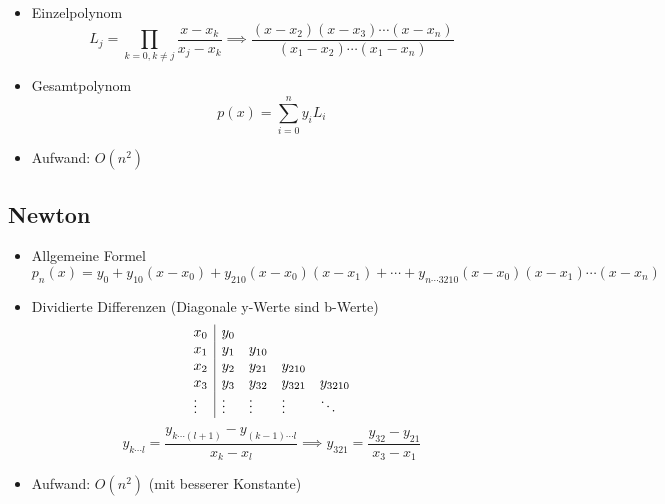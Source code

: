 \begin{itemize}
	
	\item Einzelpolynom \\
	\begin{displaymath}
		L_{j} = \prod_{k=0, k\neq j} \frac{x - x_{k}}{x_{j} - x_{k}}
		\implies
		\frac{(x - x_{2}) (x - x_{3}) \cdots (x - x_{n})}{(x_{1} - x_{2}) \cdots (x_{1} - x_{n})}
	\end{displaymath}
	
	\item Gesamtpolynom \\
	\begin{equation*}
		p(x) = \sum_{i=0}^{n} y_{i} L_{i}
	\end{equation*}
	
	\item Aufwand: $O(n^{2})$
	
\end{itemize}

\pagebreak
\subsection{Newton}

\begin{itemize}
	
	\item Allgemeine Formel \\
	\begin{equation*}
		p_n(x) = y_0 + y_{10} (x - x_0) + y_{210} (x - x_0)(x - x_1) + \cdots + y_{n\cdots 3210} (x - x_0)(x - x_1) \cdots (x - x_n)
	\end{equation*}
	
	\item Dividierte Differenzen (Diagonale y-Werte sind b-Werte)\\
	\begin{displaymath}
		\begin{array}{l | l l l l}
			x_0		& y_0 		\\
			x_1		& y_1		& y_{10}	\\
			x_2		& y_2		& y_{21}	& y_{210}	\\
			x_3		& y_3		& y_{32}	& y_{321}	& y_{3210} \\
			\vdots	& \vdots	& \vdots	& \vdots	& \ddots \\
		\end{array}
	\end{displaymath}
	\begin{displaymath}
		y_{k\cdots l} = \frac{y_{k\cdots (l+1)} - y_{(k-1)\cdots l}}{x_k - x_l}
		\implies
		y_{321} = \frac{y_{32} - y_{21}}{x_3 - x_1}
	\end{displaymath}
	
	\item Aufwand: $O(n^2)$ (mit besserer Konstante)
	
\end{itemize}

